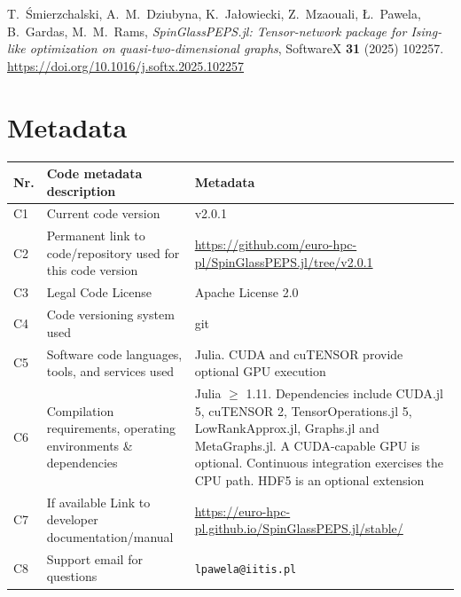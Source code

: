 \documentclass[preprint,12pt,a4paper]{elsarticle}
\begin{document}
T.~\'Smierzchalski, A.~M.~Dziubyna, K.~Ja\l{}owiecki, Z.~Mzaouali, \L{}.~Pawela,
B.~Gardas, M.~M.~Rams, \emph{SpinGlassPEPS.jl: Tensor-network package for
Ising-like optimization on quasi-two-dimensional graphs}, SoftwareX \textbf{31}
(2025) 102257. \url{https://doi.org/10.1016/j.softx.2025.102257}

\section*{Metadata}
\label{metadata}

\begin{table}[H]
\begin{tabular}{|l|>{\raggedright\arraybackslash}p{5.9cm}|>{\raggedright\arraybackslash}p{5.9cm}|}
\hline
Nr. & Code metadata description & Metadata \\
\hline
C1 & Current code version & v2.0.1 \\
\hline
C2 & Permanent link to code/repository used for this code version &
\url{https://github.com/euro-hpc-pl/SpinGlassPEPS.jl/tree/v2.0.1} \\
\hline
C3 & Legal Code License & Apache License 2.0 \\
\hline
C4 & Code versioning system used & git \\
\hline
C5 & Software code languages, tools, and services used & Julia. CUDA and
cuTENSOR provide optional GPU execution \\
\hline
C6 & Compilation requirements, operating environments \& dependencies & Julia
$\geq$ 1.11. Dependencies include CUDA.jl 5, cuTENSOR 2, TensorOperations.jl 5,
LowRankApprox.jl, Graphs.jl and MetaGraphs.jl. A CUDA-capable GPU is optional.
Continuous integration exercises the CPU path. HDF5 is an optional extension \\
\hline
C7 & If available Link to developer documentation/manual &
\url{https://euro-hpc-pl.github.io/SpinGlassPEPS.jl/stable/} \\
\hline
C8 & Support email for questions & \texttt{lpawela@iitis.pl} \\
\hline
\end{tabular}
\end{table}

\linenumbers

\end{document}
